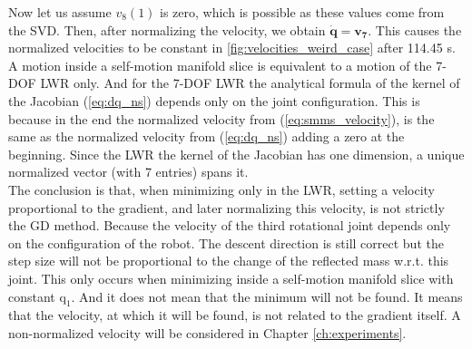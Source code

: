 Now let us assume  $v_8(1)$ is zero, which is possible as these values come from the SVD. Then, after normalizing the velocity, we obtain $\mathbf{\dot{q} =v_7 }$. This causes the normalized velocities to be constant in  \ref{fig:velocities_weird_case} after 114.45 s.\\
%
A motion inside a self-motion manifold slice is equivalent to a motion of the 7-DOF LWR only. And for the 7-DOF LWR the analytical formula of the kernel of the Jacobian (\ref{eq:dq_ns}) depends only on the joint configuration. This is because in the end the normalized velocity from (\ref{eq:smms_velocity}), is the same as the normalized velocity from (\ref{eq:dq_ns}) adding a zero at the beginning. Since the LWR the kernel of the Jacobian has one dimension,  a unique normalized vector (with 7 entries) spans it. \\
The conclusion is that, when minimizing only in the LWR, setting a velocity proportional to the gradient, and later normalizing this velocity, is not strictly the GD method. Because the velocity of the third rotational joint depends only on the configuration of the robot. The descent direction is still correct but the step size will not be proportional to the change of the reflected mass w.r.t. this joint. 
This only occurs when minimizing inside a self-motion manifold slice with constant $\mathrm{q_1}$.  And it does not mean that the minimum will not be found. It means that the velocity, at which it will be found, is not related to the gradient itself.
A non-normalized velocity will be considered in  Chapter  \ref{ch:experiments}.






